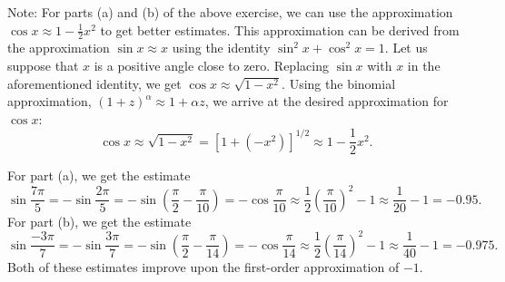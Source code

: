 \documentclass{article}
\begin{document}
Note: For parts (a) and (b) of the above exercise, we can use the approximation $\cos{x} \approx 1 - \tfrac{1}{2}x^{2}$ to get better estimates. This approximation can be derived from the approximation $\sin{x} \approx x$ using the identity $\sin^{2}{x} + \cos^{2}{x} = 1$. Let us suppose that $x$ is a positive angle close to zero. Replacing $\sin{x}$ with $x$ in the aforementioned identity, we get $\cos{x} \approx \sqrt{1 - x^{2}}$. Using the binomial approximation, $\left(1 + z\right)^{\alpha} \approx 1 + \alpha z$, we arrive at the desired approximation for $\cos{x}$:
\[
\cos{x} \approx \sqrt{1-x^{2}} = \left[1 + \left(-x^{2}\right) \right]^{1/2} \approx 1-\dfrac{1}{2}x^{2}.
\]

\noindent For part (a), we get the estimate
\[
\sin{\dfrac{7\pi}{5}} = -\sin{\dfrac{2\pi}{5}} = -\sin\left(\dfrac{\pi}{2}-\dfrac{\pi}{10}\right) = -\cos{\dfrac{\pi}{10}} \approx \dfrac{1}{2}\left(\dfrac{\pi}{10}\right)^{2} - 1 \approx \dfrac{1}{20} - 1 = -0.95.
\]
For part (b), we get the estimate
\[
\sin{\dfrac{-3\pi}{7}} = -\sin{\dfrac{3\pi}{7}} = -\sin\left(\dfrac{\pi}{2}-\dfrac{\pi}{14}\right) = -\cos{\dfrac{\pi}{14}} \approx \dfrac{1}{2}\left(\dfrac{\pi}{14}\right)^{2} - 1 \approx \dfrac{1}{40} - 1 = -0.975.
\]
Both of these estimates improve upon the first-order approximation of $-1$.
\end{document}
